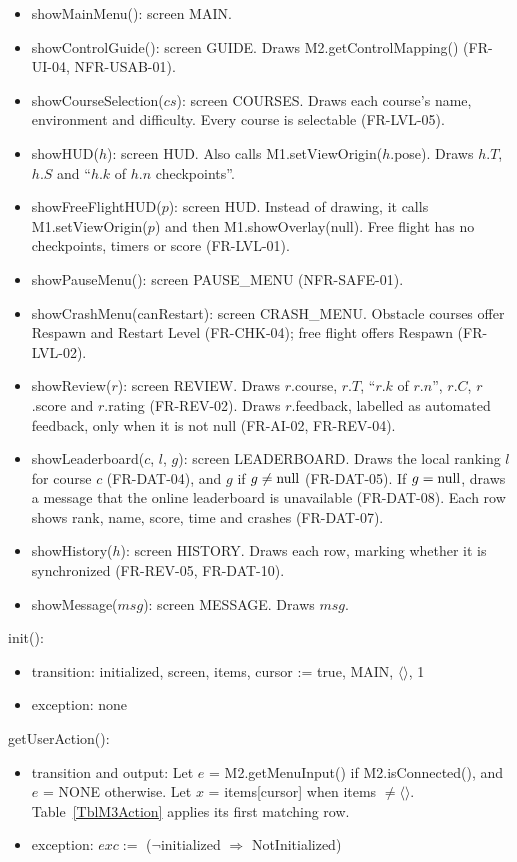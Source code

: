 \documentclass[12pt, titlepage]{article}
\newcommand{\True}{\textnormal{true}}
\newcommand{\nul}{\textnormal{null}}
\newcommand{\noinit}{$\neg$initialized $\Rightarrow$ NotInitialized}
\begin{document}
\begin{itemize}
\item showMainMenu(): screen MAIN.
\item showControlGuide(): screen GUIDE. Draws M2.getControlMapping()
  (FR-UI-04, NFR-USAB-01).
\item showCourseSelection($cs$): screen COURSES. Draws each course's name,
  environment and difficulty. Every course is selectable (FR-LVL-05).
\item showHUD($h$): screen HUD. Also calls M1.setViewOrigin($h$.pose). Draws
  $h.T$, $h.S$ and ``$h.k$ of $h.n$ checkpoints''.
\item showFreeFlightHUD($p$): screen HUD. Instead of drawing, it calls
  M1.setViewOrigin($p$) and then M1.showOverlay(\nul). Free flight has no
  checkpoints, timers or score (FR-LVL-01).
\item showPauseMenu(): screen PAUSE\_MENU (NFR-SAFE-01).
\item showCrashMenu(canRestart): screen CRASH\_MENU. Obstacle courses offer
  Respawn and Restart Level (FR-CHK-04); free flight offers Respawn
  (FR-LVL-02).
\item showReview($r$): screen REVIEW. Draws $r$.course, $r.T$, ``$r.k$ of
  $r.n$'', $r.C$, $r$.score and $r$.rating (FR-REV-02). Draws $r$.feedback,
  labelled as automated feedback, only when it is not \nul{} (FR-AI-02,
  FR-REV-04).
\item showLeaderboard($c$, $l$, $g$): screen LEADERBOARD. Draws the local
  ranking $l$ for course $c$ (FR-DAT-04), and $g$ if $g \neq \nul$
  (FR-DAT-05). If $g = \nul$, draws a message that the online leaderboard is
  unavailable (FR-DAT-08). Each row shows rank, name, score, time and crashes
  (FR-DAT-07).
\item showHistory($h$): screen HISTORY. Draws each row, marking whether it is
  synchronized (FR-REV-05, FR-DAT-10).
\item showMessage($msg$): screen MESSAGE. Draws $msg$.
\end{itemize}

\noindent init():
\begin{itemize}
\item transition: initialized, screen, items, cursor := \True, MAIN,
  $\langle\rangle$, 1
\item exception: none
\end{itemize}

\noindent getUserAction():
\begin{itemize}
\item transition and output: Let $e$ = M2.getMenuInput() if M2.isConnected(),
  and $e$ = NONE otherwise. Let $x$ = items[cursor] when items $\neq
  \langle\rangle$. Table~\ref{TblM3Action} applies its first matching row.
\item exception: $exc :=$ (\noinit)
\end{itemize}
\end{document}
